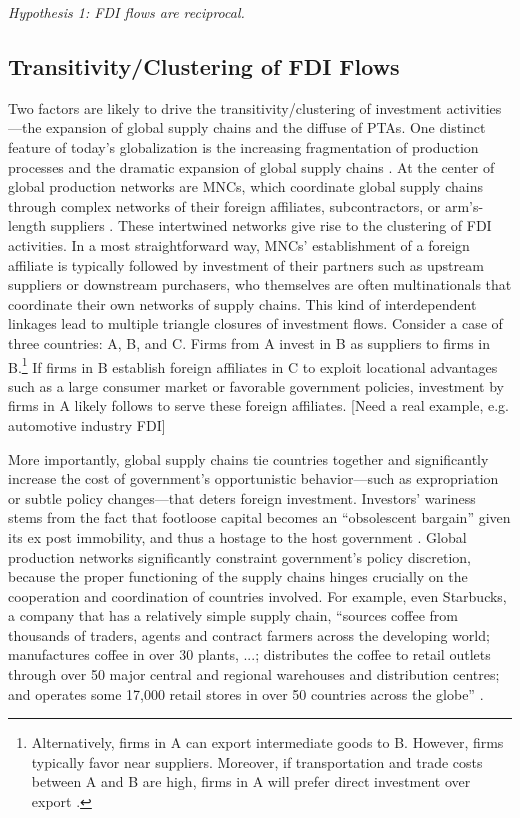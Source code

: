 \documentclass{article}
\begin{document}
\begin{center}
\textit{Hypothesis 1: FDI flows are reciprocal.}
\end{center}


\subsection{Transitivity/Clustering of FDI Flows}
Two factors are likely to drive the transitivity/clustering of investment activities---the expansion of global supply chains and the diffuse of PTAs.  One distinct feature of today's globalization is the increasing fragmentation of production processes and the dramatic expansion of global supply chains \citep{UNCTAD:2013}. At the center of global production networks are MNCs, which coordinate global supply chains through complex networks of their foreign affiliates, subcontractors, or arm's-length suppliers \citep[xxii]{UNCTAD:2013}. These intertwined networks give rise to the clustering of FDI activities. In a most straightforward way, MNCs' establishment of a foreign affiliate is typically followed by investment of their partners such as upstream suppliers or downstream purchasers, who themselves are often multinationals that coordinate their own networks of supply chains. This kind of interdependent linkages lead to multiple triangle closures of investment flows. Consider a case of three countries: A, B, and C. Firms from A invest in B as suppliers to firms in B.\footnote{Alternatively, firms in A can export intermediate goods to B. However, firms typically favor near suppliers. Moreover, if transportation and trade costs between A and B are high, firms in A will prefer direct investment over export \citep{Carr_et_al:2001}. } If firms in B establish foreign affiliates in C to exploit locational advantages such as a large consumer market or favorable government policies, investment by firms in A likely follows to serve these foreign affiliates. [Need a real example, e.g. automotive industry FDI]

More importantly, global supply chains tie countries together and significantly increase the cost of government's opportunistic behavior---such as expropriation or subtle policy changes---that deters foreign investment. Investors' wariness stems from the fact that footloose capital becomes an ``obsolescent bargain'' given its ex post immobility, and thus a hostage to the host government \citep{Vernon:1971,Vernon:1980}. Global production networks significantly constraint government's policy discretion, because the proper functioning of the supply chains hinges crucially on the cooperation and coordination of countries involved. For example, even Starbucks, a company that has a relatively simple supply chain, ``sources coffee from thousands of traders, agents and contract farmers across the developing world; manufactures coffee in over 30 plants, ...; distributes the coffee to retail outlets through over 50 major central and regional warehouses and distribution centres; and operates some 17,000 retail stores in over 50 countries across the globe'' \citep[142]{UNCTAD:2013}.
\end{document}
